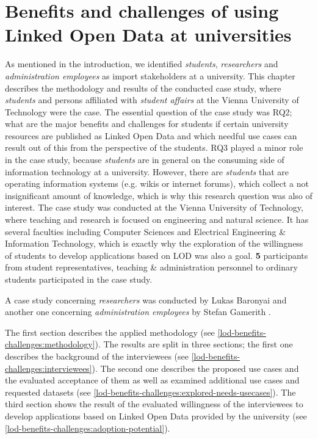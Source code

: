 \documentclass{article}
\begin{document}
\section{Benefits and challenges of using Linked Open Data at universities}
\label{lod-benefits-challenges}
As mentioned in the introduction, we identified \textit{students}, \textit{researchers} and \textit{administration employees} as import stakeholders at a university. This chapter describes the methodology and results of the conducted case study, where \textit{students} and persons affiliated with \textit{student affairs} at the Vienna University of Technology were the case. The essential question of the case study was RQ2; what are the major benefits and challenges for students if certain university resources are published as Linked Open Data and which needful use cases can result out of this from the perspective of the students. RQ3 played a minor role in the case study, because \textit{students} are in general on the consuming side of information technology at a university. However, there are \textit{students} that are operating information systems (e.g. wikis or internet forums), which collect a not insignificant amount of knowledge, which is why this research question was also of interest. The case study was conducted at the Vienna University of Technology, where teaching and research is focused on engineering and natural science.  It has several faculties including Computer Sciences and Electrical Engineering \& Information Technology, which is exactly why the exploration of the willingness of students to develop applications based on LOD was also a goal. \textbf{5} participants from student representatives, teaching \& administration personnel to ordinary students participated in the case study.

A case study concerning \textit{researchers} was conducted by Lukas Baronyai \cite{baronyai_publishing_2016} and another one concerning \textit{administration employees} by Stefan Gamerith \cite{gamerith_linked_2016}. 

The first section describes the applied methodology (see \ref{lod-benefits-challenges:methodology}). The results are split in three sections; the first one describes the background of the interviewees (see \ref{lod-benefits-challenges:interviewees}). The second one describes the proposed use cases and the evaluated acceptance of them as well as examined additional use cases and requested datasets (see \ref{lod-benefits-challenges:explored-needs-usecases}). The third section shows the result of the evaluated willingness of the interviewees to develop applications based on Linked Open Data provided by the university (see \ref{lod-benefits-challenges:adoption-potential}).
\end{document}
